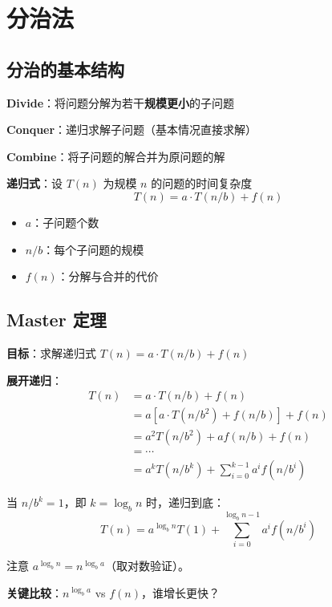 \documentclass[12pt, a4paper]{ctexart}
\begin{document}
\section{分治法}

\subsection{分治的基本结构}

\begin{blackboard}[分治法的三步]

\textbf{Divide}：将问题分解为若干\textbf{规模更小}的子问题

\textbf{Conquer}：递归求解子问题（基本情况直接求解）

\textbf{Combine}：将子问题的解合并为原问题的解

\textbf{递归式}：设 $T(n)$ 为规模 $n$ 的问题的时间复杂度
\[
T(n) = a \cdot T(n/b) + f(n)
\]
\begin{itemize}
    \item $a$：子问题个数
    \item $n/b$：每个子问题的规模
    \item $f(n)$：分解与合并的代价
\end{itemize}

\end{blackboard}

\subsection{Master 定理}

\begin{blackboard}

\textbf{目标}：求解递归式 $T(n) = a \cdot T(n/b) + f(n)$

\textbf{展开递归}：
\begin{align*}
T(n) &= a \cdot T(n/b) + f(n) \\
&= a \left[ a \cdot T(n/b^2) + f(n/b) \right] + f(n) \\
&= a^2 T(n/b^2) + a f(n/b) + f(n) \\
&= \cdots \\
&= a^k T(n/b^k) + \sum_{i=0}^{k-1} a^i f(n/b^i)
\end{align*}

当 $n/b^k = 1$，即 $k = \log_b n$ 时，递归到底：
\[
T(n) = a^{\log_b n} T(1) + \sum_{i=0}^{\log_b n - 1} a^i f(n/b^i)
\]

注意 $a^{\log_b n} = n^{\log_b a}$（取对数验证）。

\textbf{关键比较}：$n^{\log_b a}$ vs $f(n)$，谁增长更快？

\end{blackboard}
\end{document}
